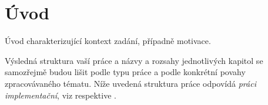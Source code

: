 \chapter{Úvod}
Úvod charakterizující kontext zadání, případně motivace.

Výsledná struktura vaší práce a názvy a rozsahy jednotlivých kapitol se samozřejmě budou lišit podle typu
práce a podle konkrétní povahy zpracovávaného tématu. Níže uvedená struktura práce odpovídá \textit{práci
implementační}, viz \cite{infodp} respektive \cite{infobp}.
